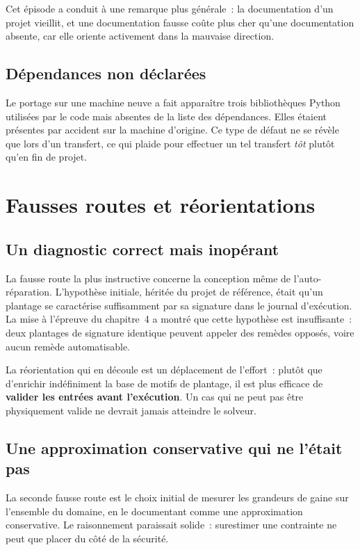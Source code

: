 \documentclass[12pt,a4paper,french]{report}
\begin{document}
Cet épisode a conduit à une remarque plus générale~: la documentation d'un
projet vieillit, et une documentation fausse coûte plus cher qu'une
documentation absente, car elle oriente activement dans la mauvaise direction.

\subsection{Dépendances non déclarées}

Le portage sur une machine neuve a fait apparaître trois bibliothèques Python
utilisées par le code mais absentes de la liste des dépendances. Elles étaient
présentes par accident sur la machine d'origine. Ce type de défaut ne se révèle
que lors d'un transfert, ce qui plaide pour effectuer un tel transfert
\emph{tôt} plutôt qu'en fin de projet.

\section{Fausses routes et réorientations}

\subsection{Un diagnostic correct mais inopérant}

La fausse route la plus instructive concerne la conception même de
l'auto-réparation. L'hypothèse initiale, héritée du projet de référence, était
qu'un plantage se caractérise suffisamment par sa signature dans le journal
d'exécution. La mise à l'épreuve du chapitre~4 a montré que cette hypothèse est
insuffisante~: deux plantages de signature identique peuvent appeler des
remèdes opposés, voire aucun remède automatisable.

La réorientation qui en découle est un déplacement de l'effort~: plutôt que
d'enrichir indéfiniment la base de motifs de plantage, il est plus efficace de
\textbf{valider les entrées avant l'exécution}. Un cas qui ne peut pas être
physiquement valide ne devrait jamais atteindre le solveur.

\subsection{Une approximation conservative qui ne l'était pas}

La seconde fausse route est le choix initial de mesurer les grandeurs de gaine
sur l'ensemble du domaine, en le documentant comme une approximation
conservative. Le raisonnement paraissait solide~: surestimer une contrainte ne
peut que placer du côté de la sécurité.
\end{document}
